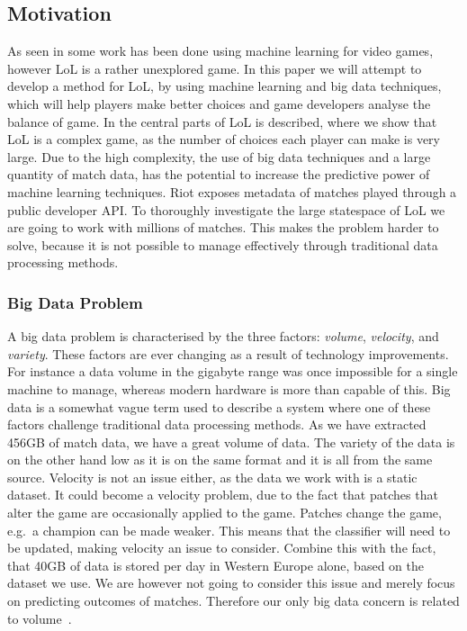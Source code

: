 \subsection{Motivation}\label{sec:motivation}
As seen in  some work has been done using machine learning for video games, however LoL is a rather unexplored game. 
In this paper we will attempt to develop a method for LoL, by using machine learning and big data techniques, which will help players make better choices and game developers analyse the balance of game. In  the central parts of LoL is described, where we show that LoL is a complex game, as the number of choices each player can make is very large. Due to the high complexity, the use of big data techniques and a large quantity of match data, has the potential to increase the predictive power of machine learning techniques. Riot exposes metadata of matches played through a public developer API. To thoroughly investigate the large statespace of LoL we are going to work with millions of matches. This makes the problem harder to solve, because it is not possible to manage effectively through traditional data processing methods.

\subsubsection{Big Data Problem}\label{sec:big_data_problem}
A big data problem is characterised by the three factors: \emph{volume}, \emph{velocity}, and \emph{variety}. These factors are ever changing as a result of technology improvements. For instance a data volume in the gigabyte range was once impossible for a single machine to manage, whereas modern hardware is more than capable of this. Big data is a somewhat vague term used to describe a system where one of these factors challenge traditional data processing methods. As we have extracted 456GB of match data, we have a great volume of data. The variety of the data is on the other hand low as it is on the same format and it is all from the same source. Velocity is not an issue either, as the data we work with is a static dataset. It could become a velocity problem, due to the fact that patches that alter the game are occasionally applied to the game. Patches change the game, e.g.\ a champion can be made weaker. This means that the classifier will need to be updated, making velocity an issue to consider. Combine this with the fact, that 40GB of data is stored per day in Western Europe alone, based on the dataset we use. We are however not going to consider this issue and merely focus on predicting outcomes of matches. Therefore our only big data concern is related to volume~\cite{madden2012databases}.

